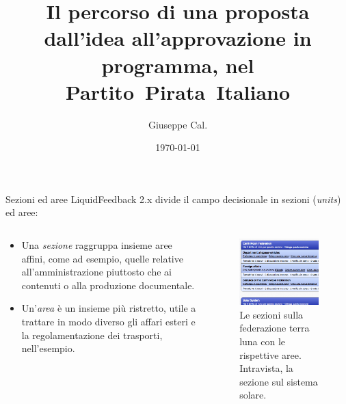 \documentclass{beamer}
\title{Il percorso di una proposta dall'idea all'approvazione in programma, nel Partito~Pirata~Italiano}
\author{Giuseppe Cal.}
\institute{Partito Pirata Italiano -- Pirate Party of Italy}
\date{\today}
\begin{document}
\begin{frame}
\maketitle
\end{frame}

\begin{frame}{Sezioni ed aree}
LiquidFeedback 2.x divide il campo decisionale in sezioni (\emph{units}) ed aree: 
\begin{columns}
\begin{column}{0.5\textwidth}
\begin{itemize}
\item Una \emph{sezione} raggruppa insieme aree affini, come ad esempio, quelle relative all'amministrazione piuttosto che ai contenuti o alla produzione documentale.
\item Un'\emph{area} \`e un insieme pi\`u ristretto, utile a trattare in modo diverso gli affari esteri e la regolamentazione dei trasporti, nell'esempio.
\end{itemize}
\end{column}
\begin{column}{0.5\textwidth}
\begin{figure}
\includegraphics[width=0.95\textwidth]{pics/unitarea}
\caption{Le sezioni sulla federazione terra luna con le rispettive aree. Intravista, la sezione sul sistema solare.}
\end{figure}
\end{column}
\end{columns}
\end{frame}
\end{document}
